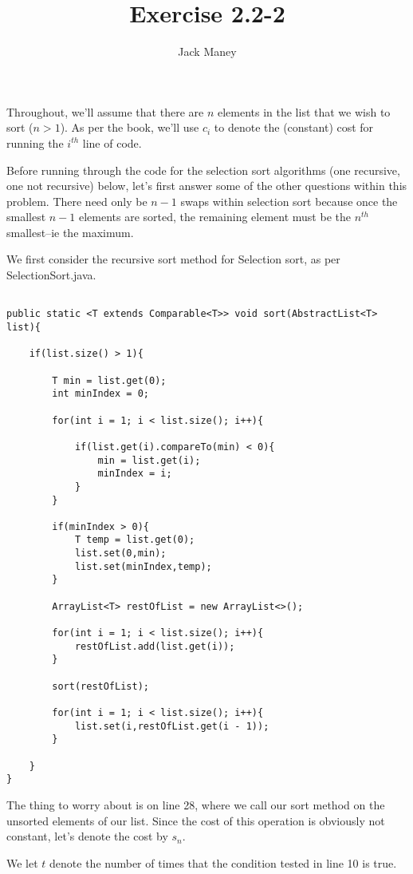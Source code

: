 \documentclass{article}
\begin{document}
\title{Exercise 2.2-2}
\author{Jack Maney}
\maketitle

Throughout, we'll assume that there are $n$ elements in the list that we wish to sort ($n>1$). As per the book, we'll use $c_i$ to denote the (constant) cost for running the $i^{th}$ line of code.

Before running through the code for the selection sort algorithms (one recursive, one not recursive) below, let's first answer some of the other questions within this problem. There need only be $n-1$ swaps within selection sort because once the smallest $n-1$ elements are sorted, the remaining element must be the $n^{th}$ smallest--ie the maximum.

We first consider the recursive sort method for Selection sort, as per SelectionSort.java. 

\begin{verbatim}

public static <T extends Comparable<T>> void sort(AbstractList<T> list){
		
	if(list.size() > 1){
		
		T min = list.get(0);
		int minIndex = 0;
		
		for(int i = 1; i < list.size(); i++){
			
			if(list.get(i).compareTo(min) < 0){
				min = list.get(i);
				minIndex = i;
			}
		}
		
		if(minIndex > 0){
			T temp = list.get(0);
			list.set(0,min);
			list.set(minIndex,temp);
		}
		
		ArrayList<T> restOfList = new ArrayList<>();
		
		for(int i = 1; i < list.size(); i++){
			restOfList.add(list.get(i));
		}
		
		sort(restOfList);
		
		for(int i = 1; i < list.size(); i++){
			list.set(i,restOfList.get(i - 1));
		}
		
	}
}

\end{verbatim}

The thing to worry about is on line 28, where we call our sort method on the unsorted elements of our list. Since the cost of this operation is obviously not constant, let's denote the cost by $s_n$.

We let $t$ denote the number of times that the condition tested in line 10 is true.
\end{document}
